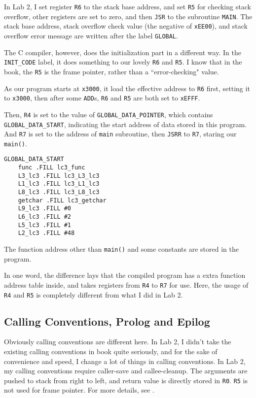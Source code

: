 \documentclass{article}
\begin{document}
	In Lab 2, I set register \texttt{R6} to the stack base address, and set \texttt{R5} for checking stack overflow, other registers are set to zero, and then \texttt{JSR} to the subroutine \texttt{MAIN}. The stack base address, stack overflow check value (the negative of \texttt{xEE00}), and stack overflow error message are written after the label \texttt{GLOBAL}.
	
	The C compiler, however, does the initialization part in a different way. In the \texttt{INIT\_CODE} label, it does something to our lovely \texttt{R6} and \texttt{R5}. I know that in the book\cite[Chapter~14]{ics}, the \texttt{R5} is the frame pointer, rather than a ``error-checking" value.
	
	As our program starts at \texttt{x3000}, it load the effective address to \texttt{R6} first, setting it to \texttt{x3000}, then after some \texttt{ADD}s, \texttt{R6} and \texttt{R5} are both set to \texttt{xEFFF}.
	
	Then, \texttt{R4} is set to the value of \texttt{GLOBAL\_DATA\_POINTER}, which contains \\ \texttt{GLOBAL\_DATA\_START}, indicating the start address of data stored in this program. And \texttt{R7} is set to the address of \texttt{main} subroutine, then \texttt{JSRR} to \texttt{R7}, staring our \texttt{main()}.
	
	\begin{lstlisting}[caption={The contents of \texttt{GLOBAL\_DATA\_START}}]
	GLOBAL_DATA_START
	func .FILL lc3_func
	L3_lc3 .FILL lc3_L3_lc3
	L1_lc3 .FILL lc3_L1_lc3
	L8_lc3 .FILL lc3_L8_lc3
	getchar .FILL lc3_getchar
	L9_lc3 .FILL #0
	L6_lc3 .FILL #2
	L5_lc3 .FILL #1
	L2_lc3 .FILL #48
	\end{lstlisting}
	
	The function address other than \texttt{main()} and some constants are stored in the program.
	
	In one word, the difference lays that the compiled program has a extra function address table inside, and takes registers from \texttt{R4} to \texttt{R7} for use. Here, the usage of \texttt{R4} and \texttt{R5} is completely different from what I did in Lab 2.
	
	\subsection{Calling Conventions, Prolog and Epilog}
	Obviously calling conventions are different here. In Lab 2, I didn't take the existing calling conventions in book quite seriously, and for the sake of convenience and speed, I change a lot of things in calling conventions. In Lab 2, my calling conventions require caller-save and callee-cleanup. The arguments are pushed to stack from right to left, and return value is directly stored in \texttt{R0}. \texttt{R5} is not used for frame pointer. For more details, see \cite{lab2-tky}.
	
\end{document}
